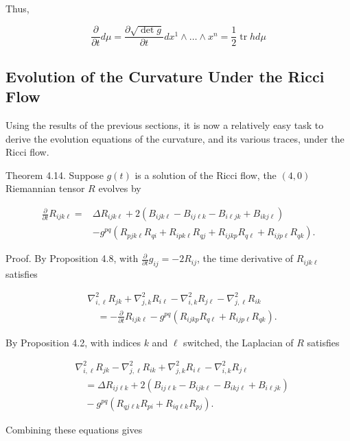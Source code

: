 \documentclass[10pt, letterpaper]{article}
\begin{document}
Thus,

$$
\frac{\partial}{\partial t} d \mu=\frac{\partial \sqrt{\operatorname{det} g}}{\partial t} d x^{1} \wedge \ldots \wedge x^{n}=\frac{1}{2} \operatorname{tr} h d \mu
$$

\subsection*{Evolution of the Curvature Under the Ricci Flow}
Using the results of the previous sections, it is now a relatively easy task to derive the evolution equations of the curvature, and its various traces, under the Ricci flow.

Theorem 4.14. Suppose $g(t)$ is a solution of the Ricci flow, the $(4,0)$ Riemannian tensor $R$ evolves by

$$
\begin{aligned}
\frac{\partial}{\partial t} R_{i j k \ell}= & \Delta R_{i j k \ell}+2\left(B_{i j k \ell}-B_{i j \ell k}-B_{i \ell j k}+B_{i k j \ell}\right) \\
& -g^{p q}\left(R_{p j k \ell} R_{q i}+R_{i p k \ell} R_{q j}+R_{i j k p} R_{q \ell}+R_{i j p \ell} R_{q k}\right) .
\end{aligned}
$$

Proof. By Proposition 4.8, with $\frac{\partial}{\partial t} g_{i j}=-2 R_{i j}$, the time derivative of $R_{i j k \ell}$ satisfies

$$
\begin{aligned}
& \nabla_{i, \ell}^{2} R_{j k}+\nabla_{j, k}^{2} R_{i \ell}-\nabla_{i, k}^{2} R_{j \ell}-\nabla_{j, \ell}^{2} R_{i k} \\
& \quad=-\frac{\partial}{\partial t} R_{i j k \ell}-g^{p q}\left(R_{i j k p} R_{q \ell}+R_{i j p \ell} R_{q k}\right) .
\end{aligned}
$$

By Proposition 4.2, with indices $k$ and $\ell$ switched, the Laplacian of $R$ satisfies

$$
\begin{aligned}
& \nabla_{i, \ell}^{2} R_{j k}-\nabla_{j, \ell}^{2} R_{i k}+\nabla_{j, k}^{2} R_{i \ell}-\nabla_{i, k}^{2} R_{j \ell} \\
& \quad=\Delta R_{i j \ell k}+2\left(B_{i j \ell k}-B_{i j k \ell}-B_{i k j \ell}+B_{i \ell j k}\right) \\
& \quad-g^{p q}\left(R_{q j \ell k} R_{p i}+R_{i q \ell k} R_{p j}\right) .
\end{aligned}
$$

Combining these equations gives
\end{document}

